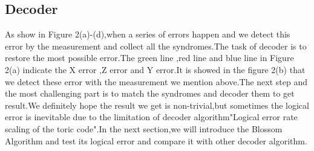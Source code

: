 \documentclass[
	a4paper, %
	10pt, %
	unnumberedsections, %
	twoside, %
]{LTJournalArticle}
\begin{document}
\subsection{Decoder}
As show in Figure 2(a)-(d),when a series of errors happen and we detect this error by the measurement and collect all the syndromes.The task of decoder is to restore the most possible error.The green line ,red line and blue line in Figure 2(a) indicate the X error ,Z error and Y error.It is showed in the figure 2(b) that we detect these error with the measurement we mention above.The next step and the most challenging part is to match the syndromes and decoder them to get result.We definitely hope the result we get is non-trivial,but sometimes the logical error is inevitable due to the limitation of decoder algorithm"Logical error rate scaling of the toric code".In the next section,we will introduce the Blossom Algorithm and test its logical error and compare it with other decoder algorithm.

\end{document}
